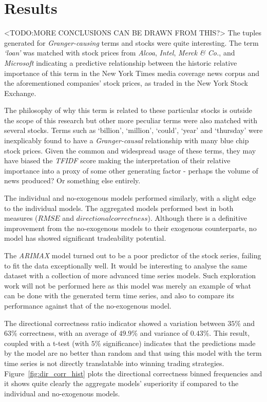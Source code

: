 \documentclass[conference,11pt]{IEEEtran}
\begin{document}
\section{Results}
<TODO:MORE CONCLUSIONS CAN BE DRAWN FROM THIS?>
The tuples generated for \textit{Granger-causing} terms and stocks were quite interesting. The term \textit{`loan'} was matched with stock prices from \textit{Alcoa}, \textit{Intel}, \textit{Merck \& Co.}, and \textit{Microsoft} indicating a predictive relationship between the historic relative importance of this term in the New York Times media coverage news corpus and the aforementioned companies' stock prices, as traded in the New York Stock Exchange.

\par
The philosophy of why this term is related to these particular stocks is outside the scope of this research but other more peculiar terms were also matched with several stocks. Terms such as `billion', `million', `could', `year' and `thursday'  were inexplicably found to have a \textit{Granger-causal} relationship with many blue chip stock prices. Given the common and widespread usage of these terms, they may have biased the \textit{TFIDF} score making the interpretation of their relative importance into a proxy of some other generating factor - perhaps the volume of news produced? Or something else entirely.

\par
The individual and no-exogenous models performed similarly, with a slight edge to the individual models. The aggregated models performed best in both measures (\(RMSE\) and \(directional correctness\)). Although there is a definitive improvement from the no-exogenous models to their exogenous counterparts, no model has showed significant tradeability potential.

\par
The \textit{ARIMAX} model turned out to be a poor predictor of the stock series, failing to fit the data exceptionally well. It would be interesting to analyse the same dataset with a collection of more advanced time series models. Such exploration work will not be performed here as this model was merely an example of what can be done with the generated term time series, and also to compare its performance against that of the no-exogenous model.

\par
The directional correctness ratio indicator showed a variation between \(35\%\) and \(63\%\) correctness, with an average of \(49.9\%\) and variance of \(0.43\%\). This result, coupled with a  t-test (with \(5\%\) significance) indicates that the predictions made by the model are no better than random and that using this model with the term time series is not directly translatable into winning trading strategies. Figure~\ref{fig:dir_corr_hist} plots the directional correctness binned frequencies and it shows quite clearly the aggregate models' superiority if compared to the individual and no-exogenous models.
\end{document}
